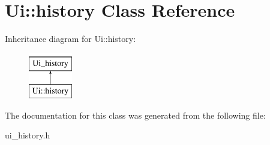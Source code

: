 \hypertarget{classUi_1_1history}{
\section{Ui::history Class Reference}
\label{classUi_1_1history}
}
Inheritance diagram for Ui::history:\begin{figure}[H]
\begin{center}
\leavevmode
\includegraphics[height=2.000000cm]{classUi_1_1history}
\end{center}
\end{figure}


The documentation for this class was generated from the following file:\begin{DoxyCompactItemize}
\item 
ui\_\-history.h\end{DoxyCompactItemize}
